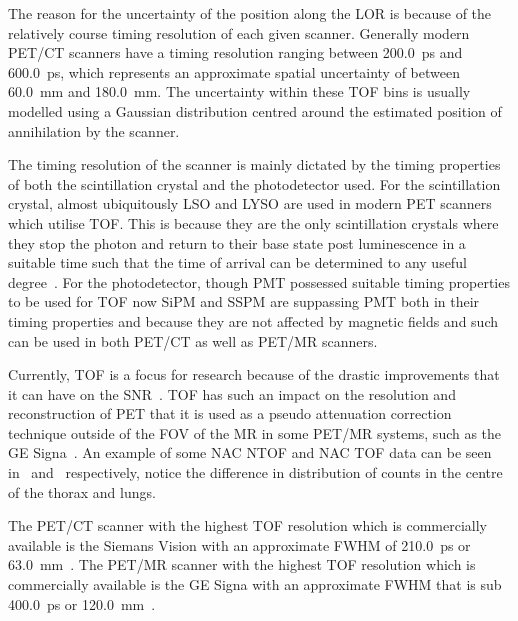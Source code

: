                 The reason for the uncertainty of the position along the \gls{LOR} is because of the relatively course timing resolution of each given scanner. Generally modern \gls{PET}/\gls{CT} scanners have a timing resolution ranging between \SI{200.0}{\pico\second} and \SI{600.0}{\pico\second}, which represents an approximate spatial uncertainty of between \SI{60.0}{\milli\metre} and \SI{180.0}{\milli\metre}. The uncertainty within these \gls{TOF} bins is usually modelled using a Gaussian distribution centred around the estimated position of annihilation by the scanner.
                
                The timing resolution of the scanner is mainly dictated by the timing properties of both the scintillation crystal and the photodetector used. For the scintillation crystal, almost ubiquitously \gls{LSO} and \gls{LYSO} are used in modern \gls{PET} scanners which utilise \gls{TOF}. This is because they are the only scintillation crystals where they stop the photon and return to their base state post luminescence in a suitable time such that the time of arrival can be determined to any useful degree~. For the photodetector, though \gls{PMT} possessed suitable timing properties to be used for \gls{TOF} now \gls{SiPM} and \gls{SSPM} are suppassing \gls{PMT} both in their timing properties and because they are not affected by magnetic fields and such can be used in both \gls{PET}/\gls{CT} as well as \gls{PET}/\gls{MR} scanners.
                
                Currently, \gls{TOF} is a focus for research because of the drastic improvements that it can have on the \gls{SNR}~. \gls{TOF} has such an impact on the resolution and reconstruction of \gls{PET} that it is used as a pseudo attenuation correction technique outside of the \gls{FOV} of the \gls{MR} in some \gls{PET}/\gls{MR} systems, such as the \gls{GE} Signa~. An example of some \gls{NAC} \gls{NTOF} and \gls{NAC} \gls{TOF} data can be seen in~ and~ respectively, notice the difference in distribution of counts in the centre of the thorax and lungs.
                
                The \gls{PET}/\gls{CT} scanner with the highest \gls{TOF} resolution which is commercially available is the Siemans Vision with an approximate \gls{FWHM} of \SI{210.0}{\pico\second} or \SI{63.0}{\milli\metre}~. The \gls{PET}/\gls{MR} scanner with the highest \gls{TOF} resolution which is commercially available is the \gls{GE} Signa with an approximate \gls{FWHM} that is sub \SI{400.0}{\pico\second} or \SI{120.0}{\milli\metre}~.
            
